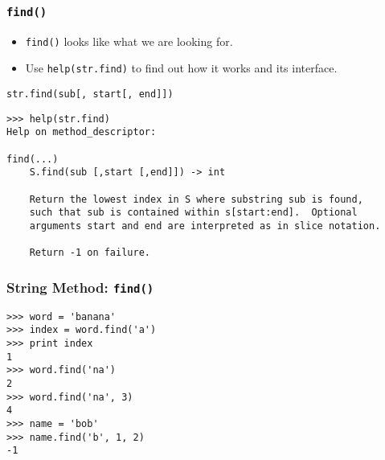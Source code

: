 \documentclass{beamer}
\newcommand{\beforeverb}{\footnotesize}
\newcommand{\afterverb}{\normalsize}
\begin{document}
\begin{frame}[fragile]
\frametitle{{\tt find()}}
\begin{itemize}
\item {\tt find()} looks like what we are looking for.
\item Use {\tt help(str.find)} to find out how it works  and its interface. 
\end{itemize}

\begin{block}{\texttt{str.find(sub[, start[, end]])}} 
\tiny
\begin{verbatim}
>>> help(str.find)
Help on method_descriptor:

find(...)
    S.find(sub [,start [,end]]) -> int
    
    Return the lowest index in S where substring sub is found,
    such that sub is contained within s[start:end].  Optional
    arguments start and end are interpreted as in slice notation.
    
    Return -1 on failure.
\end{verbatim}
\end{block} 
\end{frame}
\begin{frame}[fragile]
\frametitle{String Method: \texttt{find()}}

\begin{block}{}
\beforeverb
\begin{verbatim}
>>> word = 'banana'
>>> index = word.find('a')
>>> print index
1
>>> word.find('na')
2
>>> word.find('na', 3)
4
>>> name = 'bob'
>>> name.find('b', 1, 2)
-1
\end{verbatim}
\afterverb
%
\end{block}


\end{frame}


%
\end{document}
